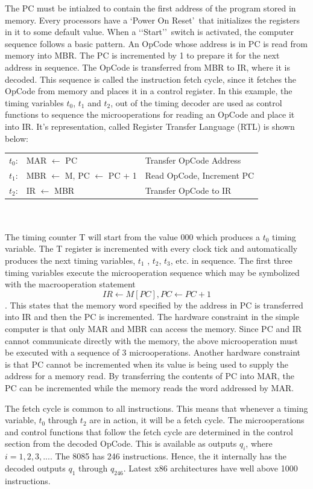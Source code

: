 \documentclass{book}
\begin{document}
The PC must be intialzed to contain the first address of the program stored in memory. Every processors have a \lq Power On Reset\rq\ that initializes the registers in it to some default value. When a \lq\lq Start\rq\rq\ switch is activated, the computer sequence follows a basic pattern. An OpCode whose address is in PC is read from memory into MBR. The PC is incremented by 1 to prepare it for the next address in sequence. The OpCode is transferred from MBR to IR, where it is decoded. This sequence is called the instruction fetch cycle, since it fetches the OpCode from memory and places it in a control register. In this example, the timing variables $t_0$, $t_1$ and $t_2$, out of the timing decoder are used as control functions to sequence the microoperations for reading an OpCode and place it into IR. It\rq s representation, called Register Transfer Language (RTL) is shown below:\\[.5pt]

\begin{tabular}{r l l}
$t_0$: & MAR $\leftarrow$ PC & Transfer OpCode Address \\
$t_1$: & MBR $\leftarrow$ M, PC $\leftarrow$ PC + 1 & Read OpCode, Increment PC\\
$t_2$: & IR $\leftarrow$ MBR & Transfer OpCode to IR\\
\end{tabular}
\\
\\
The timing counter T will start from the value 000 which produces a $t_0$ timing variable. The T register is incremented with every clock tick and automatically produces the next timing variables, $t_1$ , $t_2$, $t_3$, etc. in sequence. The first three timing variables execute the microoperation sequence which may be symbolized with the macrooperation statement $$ IR \leftarrow M[PC], PC \leftarrow PC + 1$$. This states that the memory word specified by the address in PC is transferred into IR and then the PC is incremented. The hardware constraint in the simple computer is that only MAR and MBR can access the memory. Since PC and IR cannot communicate directly with the memory, the above microoperation must be executed with a sequence of 3 microoperations. Another hardware constraint is that PC cannot be incremented when its value is being used to supply the address for a memory read. By transferring the contents of PC into MAR, the PC can be incremented while the memory reads the word addressed by MAR.

The fetch cycle is common to all instructions. This means that whenever a timing variable, $t_0$ through $t_2$ are in action, it will be a fetch cycle. The microoperations and control functions that follow the fetch cycle are determined in the control section from the decoded OpCode. This is available as outputs $q_i$, where $i = 1, 2, 3,...$. The 8085 has 246 instructions. Hence, the it internally has the decoded outputs $q_1$ through $q_{246}$. Latest x86 architectures have well above 1000 instructions.
\end{document}
